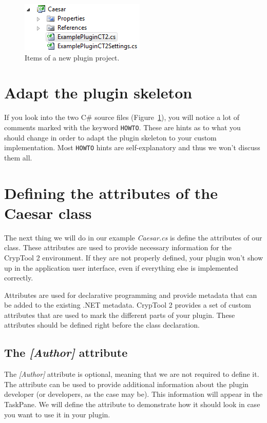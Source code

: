 \begin{figure}[h!]
	\centering
		\includegraphics{figures/caesar_project.png}
	\caption{Items of a new plugin project.}
	\label{fig:caesar_project}
\end{figure}

\section{Adapt the plugin skeleton}
\label{AdaptingThePluginSkeleton}

If you look into the two C\# source files (Figure~\ref{fig:caesar_project}), you will notice a lot of comments marked with the keyword \texttt{HOWTO}. These are hints as to what you should change in order to adapt the plugin skeleton to your custom implementation. Most \texttt{HOWTO} hints are self-explanatory and thus we won't discuss them all.

\section{Defining the attributes of the Caesar class}
\label{sec:DefiningTheAttributesOfTheCaesarClass}

The next thing we will do in our example \textit{Caesar.cs} is define the attributes of our class. These attributes are used to provide necessary information for the CrypTool 2 environment. If they are not properly defined, your plugin won't show up in the application user interface, even if everything else is implemented correctly.

Attributes are used for declarative programming and provide metadata that can be added to the existing .NET metadata. CrypTool 2 provides a set of custom attributes that are used to mark the different parts of your plugin. These attributes should be defined right before the class declaration.

\subsection{The \protect\textit{[Author]} attribute}
\label{sec:TheAuthorAttribute}

The \textit{[Author]} attribute is optional, meaning that we are not required to define it. The attribute can be used to provide additional information about the plugin developer (or developers, as the case may be). This information will appear in the TaskPane. We will define the attribute to demonstrate how it should look in case you want to use it in your plugin.

